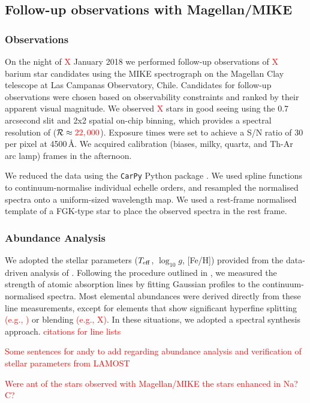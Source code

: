 \documentclass[a4paper,fleqn,usenatbib]{mnras}
\newcommand{\todo}[1]{\textcolor{red}{#1}}
\begin{document}
\subsection{Follow-up observations with Magellan/MIKE}

\subsubsection{Observations}
On the night of \todo{X} January 2018 we performed follow-up observations of \todo{X} barium star candidates using the MIKE spectrograph on the Magellan Clay telescope at Las Campanas Observatory, Chile. Candidates for follow-up observations were chosen based on observability constraints and ranked by their apparent visual magnitude. We observed \todo{X} stars in good seeing using the 0.7 arcsecond slit and 2x2 spatial on-chip binning, which provides a spectral resolution of ($\mathcal{R} \approx \todo{22,000}$). Exposure times were set to achieve a S/N ratio of 30 per pixel at 4500\,\AA. We acquired calibration (biases, milky, quartz, and Th-Ar arc lamp) frames in the afternoon.

We reduced the data using the \texttt{CarPy} Python package \citep{kels03,kels14}. We used spline functions to continuum-normalise individual echelle orders, and resampled the normalised spectra onto a uniform-sized wavelength map. We used a rest-frame normalised template of a FGK-type star to place the observed spectra in the rest frame.


\subsubsection{Abundance Analysis}
We adopted the stellar parameters ($T_{\rm eff}$, $\log_{10}g$, [Fe/H]) provided from the data-driven analysis of \citep{Ho_2017}. Following the procedure outlined in \citep{Casey_2014}, we measured the strength of atomic absorption lines by fitting Gaussian profiles to the continuum-normalised spectra. Most elemental abundances were derived directly from these line measurements, except for elements that show significant hyperfine splitting \todo{(e.g., )} or blending \todo{(e.g., X)}. In these situations, we adopted a spectral synthesis approach. \todo{citations for line lists}


\todo{Some sentences for andy to add regarding abundance analysis and verification of stellar parameters from LAMOST}

\todo{Were ant of the stars observed with Magellan/MIKE the stars enhanced in Na? C?}
\end{document}
